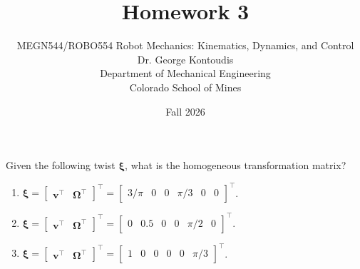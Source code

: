 \documentclass[12pt]{article}
\newenvironment{problem}[2][Problem]{\begin{trivlist}
\item[\hskip \labelsep {\bfseries #1}\hskip \labelsep {\bfseries #2.}]}{\end{trivlist}}
\begin{document}
 
 
\title{Homework 3}
\author{MEGN544/ROBO554 Robot Mechanics: Kinematics, Dynamics, and Control  
\\ 
Dr. George Kontoudis\\
Department of Mechanical Engineering\\
Colorado School of Mines}
\date{Fall 2026}
 
\maketitle
\begin{problem}{1}%
Given the following twist $\boldsymbol{\xi}$, what is the homogeneous transformation matrix?
\begin{enumerate}[label=(\alph*)]
    \item $\boldsymbol{\xi} = \begin{bmatrix}
        \boldsymbol{v}^{\intercal} & \boldsymbol{\Omega}^{\intercal}
        \end{bmatrix}^{\intercal} = \begin{bmatrix}
        3/\pi & 0 & 0 & \pi/3 & 0 & 0
        \end{bmatrix}^{\intercal}$.
    \item $\boldsymbol{\xi} = \begin{bmatrix}
        \boldsymbol{v}^{\intercal} & \boldsymbol{\Omega}^{\intercal}
        \end{bmatrix}^{\intercal} = \begin{bmatrix}
        0 & 0.5 & 0 & 0 & \pi/2 & 0
        \end{bmatrix}^{\intercal}$.
    \item $\boldsymbol{\xi} = \begin{bmatrix}
        \boldsymbol{v}^{\intercal} & \boldsymbol{\Omega}^{\intercal}
        \end{bmatrix}^{\intercal} = \begin{bmatrix}
        1 & 0 & 0 & 0 & 0 & \pi/3
        \end{bmatrix}^{\intercal}$.
\end{enumerate}
 
\end{problem}
\end{document}
